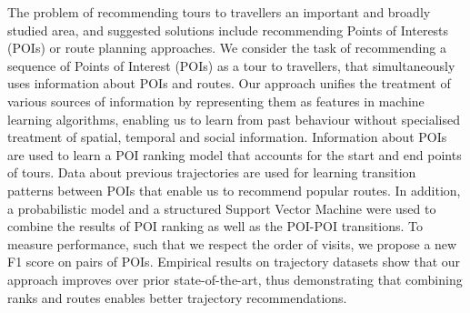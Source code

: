 The problem of recommending tours to travellers an important and broadly studied area,
and suggested solutions include recommending Points of Interests (POIs)
or route planning approaches.
We consider the task of recommending a sequence of Points of Interest (POIs) as a tour
to travellers, that simultaneously uses information about POIs and routes.
Our approach unifies the treatment of various sources of information
by representing them as features in machine learning algorithms, enabling us to
learn from past behaviour without specialised treatment of
spatial, temporal and social information.
Information about POIs are used to learn a POI ranking model
that accounts for the start and end points of tours.
Data about previous trajectories are used for learning transition patterns between POIs that
enable us to recommend popular routes.
In addition, a probabilistic model and a structured Support Vector Machine were used
to combine the results of POI ranking as well as the POI-POI transitions.
To measure performance, such that we respect the order of visits, we propose
a new F1 score on pairs of POIs.
Empirical results on trajectory datasets show that our approach improves over prior
state-of-the-art, thus demonstrating that
combining ranks and routes enables better trajectory recommendations.
